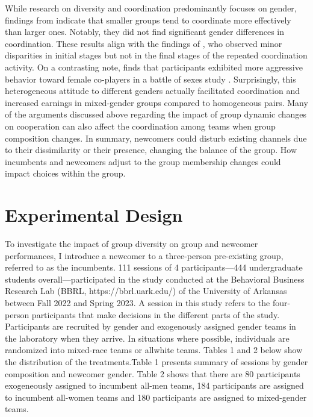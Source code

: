 \hspace {0mm} While research on diversity and coordination predominantly focuses on gender, findings from \cite{g} indicate that smaller groups tend to coordinate more effectively than larger ones. Notably, they did not find significant gender differences in coordination. These results align with the findings of \cite{dg05}, who observed minor disparities in initial stages but not in the final stages of the repeated coordination activity. On a contrasting note, \cite{h00} finds that participants exhibited more aggressive behavior toward female co-players in a battle of sexes study . Surprisingly, this heterogeneous attitude to different genders actually facilitated coordination and increased earnings in mixed-gender groups compared to homogeneous pairs. Many of the arguments discussed above regarding the impact of group dynamic changes on cooperation can also affect the coordination among teams when group composition changes. In summary, newcomers could disturb existing channels due to their dissimilarity or their presence, changing the balance of the group. How incumbents and newcomers adjust to the group membership changes could impact choices within the group. 

 
\section{Experimental Design} \label{sec:Design}

To investigate the impact of group diversity on group and newcomer performances, I introduce a newcomer to a three-person pre-existing group, referred to as the incumbents.  111 sessions of 4 participants—444 undergraduate students overall—participated in the study conducted at the Behavioral Business Research Lab (BBRL, https://bbrl.uark.edu/) of the University of Arkansas between Fall 2022 and Spring 2023. A session in this study refers to the four-person participants that make decisions in the different parts of the study. Participants are recruited by gender and exogenously assigned gender teams in the laboratory when they arrive. In situations where possible, individuals are randomized into mixed-race teams or allwhite teams. Tables 1 and 2 below show the distribution of the treatments.Table 1 presents summary of sessions by gender composition and newcomer gender. Table 2 shows that there are 80 participants exogeneously assigned to incumbent all-men teams, 184 participants are assigned to incumbent all-women teams and 180 participants are assigned to mixed-gender teams. 


